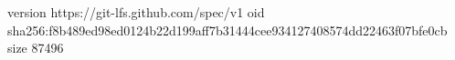 version https://git-lfs.github.com/spec/v1
oid sha256:f8b489ed98ed0124b22d199aff7b31444cee934127408574dd22463f07bfe0cb
size 87496
